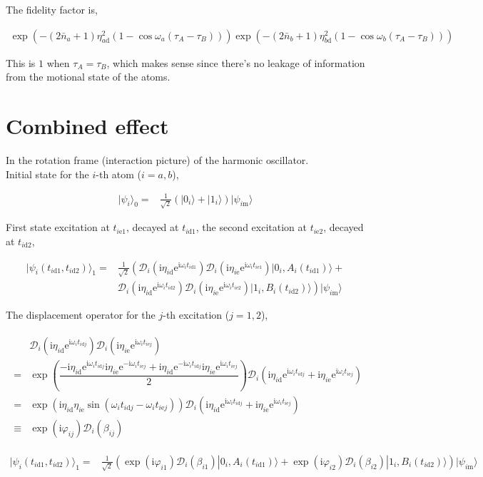 \documentclass[10pt,fleqn]{article}
\newcommand{\ue}{\mathrm{e}}
\newcommand{\ui}{\mathrm{i}}
\newcommand{\eqar}[1]
{
  \begin{align}
    #1
  \end{align}
}
\newcommand{\paren}[1]{{\left({#1}\right)}}
\newcommand{\lparen}[1]{{\left({#1}\right.}}
\newcommand{\rparen}[1]{{\left.{#1}\right)}}
\begin{document}
The fidelity factor is,
\eqar{
  \exp\paren{
    -\paren{2{\bar n_a}+1}\eta_{a\mathrm{d}}^2\paren{1-\cos\omega_a\paren{\tau_{A}-\tau_{B}}}
  }
  \exp\paren{
    -\paren{2{\bar n_b}+1}\eta_{b\mathrm{d}}^2\paren{1-\cos\omega_b\paren{\tau_{A}-\tau_{B}}}
  }
}
This is $1$ when $\tau_A=\tau_B$, which makes sense since there's no leakage of
information from the motional state of the atoms.

\section{Combined effect}

In the rotation frame (interaction picture) of the harmonic oscillator.\\

Initial state for the $i$-th atom ($i=a,b$),
\eqar{
  |\psi_i\rangle_0=&\frac{1}{\sqrt2}\paren{|0_i\rangle+|1_i\rangle}|\psi_{i\mathrm{m}}\rangle
}
First state excitation at $t_{i\mathrm{e}1}$, decayed at $t_{i\mathrm{d}1}$,
the second excitation at $t_{i\mathrm{e}2}$, decayed at $t_{i\mathrm{d}2}$,
\eqar{
  |\psi_i(t_{i\mathrm{d}1},t_{i\mathrm{d}2})\rangle_1=&\frac{1}{\sqrt2}\lparen{\mathcal{D}_i(\ui\eta_{i\mathrm{d}}\ue^{\ui\omega_it_{i\mathrm{d}1}})\mathcal{D}_i(\ui\eta_{i\mathrm{e}}\ue^{\ui\omega_it_{i\mathrm{e}1}})|0_i,A_i(t_{i\mathrm{d}1})\rangle}+\\
  &\rparen{\mathcal{D}_i(\ui\eta_{i\mathrm{d}}\ue^{\ui\omega_it_{i\mathrm{d}2}})\mathcal{D}_i(\ui\eta_{i\mathrm{e}}\ue^{\ui\omega_it_{i\mathrm{e}2}})|1_i,B_i(t_{i\mathrm{d}2})\rangle}|\psi_{i\mathrm{m}}\rangle
}

The displacement operator for the $j$-th excitation ($j=1,2$),
\eqar{
  \begin{split}
    &\mathcal{D}_i(\ui\eta_{i\mathrm{d}}\ue^{\ui\omega_it_{i\mathrm{d}j}})\mathcal{D}_i(\ui\eta_{i\mathrm{e}}\ue^{\ui\omega_it_{i\mathrm{e}j}})\\
    =&
       \exp\paren{
       \dfrac{-\ui\eta_{i\mathrm{d}}\ue^{\ui\omega_it_{i\mathrm{d}j}}
       \ui\eta_{i\mathrm{e}}\ue^{-\ui\omega_it_{i\mathrm{e}j}}
       +\ui\eta_{i\mathrm{d}}\ue^{-\ui\omega_it_{i\mathrm{d}j}}
       \ui\eta_{i\mathrm{e}}\ue^{\ui\omega_it_{i\mathrm{e}j}}}{2}
       }
       \mathcal{D}_i(\ui\eta_{i\mathrm{d}}\ue^{\ui\omega_it_{i\mathrm{d}j}}+\ui\eta_{i\mathrm{e}}\ue^{\ui\omega_it_{i\mathrm{e}j}})\\
    =&\exp\paren{
       \ui\eta_{i\mathrm{d}}\eta_{i\mathrm{e}}
       \sin\paren{\omega_it_{i\mathrm{d}j}-\omega_it_{i\mathrm{e}j}}
       }
       \mathcal{D}_i(\ui\eta_{i\mathrm{d}}\ue^{\ui\omega_it_{i\mathrm{d}j}}+\ui\eta_{i\mathrm{e}}\ue^{\ui\omega_it_{i\mathrm{e}j}})\\
    \equiv&\exp\paren{\ui\varphi_{ij}}\mathcal{D}_i(\beta_{ij})
  \end{split}
}
\eqar{
  |\psi_i(t_{i\mathrm{d}1},t_{i\mathrm{d}2})\rangle_1=&\frac{1}{\sqrt2}\paren{\exp\paren{\ui\varphi_{i1}}\mathcal{D}_i(\beta_{i1})|0_i,A_i(t_{i\mathrm{d}1})\rangle+\exp\paren{\ui\varphi_{i2}}\mathcal{D}_i(\beta_{i2})|1_i,B_i(t_{i\mathrm{d}2})\rangle}|\psi_{i\mathrm{m}}\rangle
}
\end{document}
